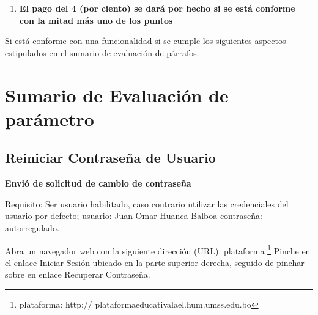 \begin{enumerate}
\begin{itemize}
\end{itemize}

\item \textbf{El pago del 4 (por ciento) se dar\'{a} por hecho si se está conforme 
con la mitad más uno de los puntos}

\end{enumerate}

Si está conforme con una funcionalidad si se cumple los siguientes aspectos
estipulados en el sumario de evaluación de párrafos.

\section{Sumario de Evaluación de parámetro}

\subsection{Reiniciar Contraseña de Usuario}

\textbf{Envió de solicitud de cambio de contraseña}

Requisito: Ser usuario habilitado, caso contrario utilizar las credenciales del
usuario por defecto; usuario: Juan Omar Huanca Balboa contraseña: autorregulado.

Abra un navegador web con la siguiente dirección (URL): plataforma 
\footnote{plataforma: http:// plataformaeducativalael.hum.umss.edu.bo} Pinche en
el enlace Iniciar Sesión ubicado en la parte superior derecha, seguido de
pinchar sobre en enlace Recuperar Contraseña.

